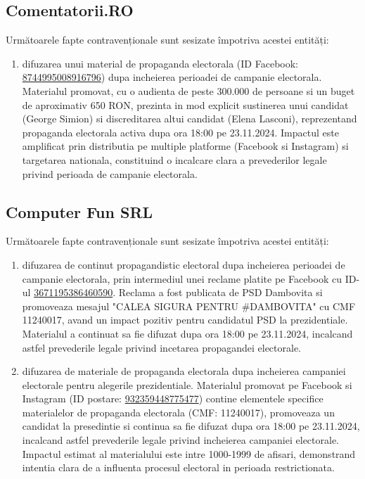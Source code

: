 \documentclass[a4paper,12pt]{article}
\begin{document}
\vspace{0.5cm}

\subsection{Comentatorii.RO}
Următoarele fapte contravenționale sunt sesizate împotriva acestei entități:

\begin{enumerate}[leftmargin=*, label=\arabic*.)]
    \item difuzarea unui material de propaganda electorala (ID Facebook: \href{https://www.facebook.com/ads/library/?id=8744995008916796}{8744995008916796}) dupa incheierea perioadei de campanie electorala. Materialul promovat, cu o audienta de peste 300.000 de persoane si un buget de aproximativ 650 RON, prezinta in mod explicit sustinerea unui candidat (George Simion) si discreditarea altui candidat (Elena Lasconi), reprezentand propaganda electorala activa dupa ora 18:00 pe 23.11.2024. Impactul este amplificat prin distributia pe multiple platforme (Facebook si Instagram) si targetarea nationala, constituind o incalcare clara a prevederilor legale privind perioada de campanie electorala.
\end{enumerate}

\vspace{0.5cm}

\subsection{Computer Fun SRL}
Următoarele fapte contravenționale sunt sesizate împotriva acestei entități:

\begin{enumerate}[leftmargin=*, label=\arabic*.)]
    \item difuzarea de continut propagandistic electoral dupa incheierea perioadei de campanie electorala, prin intermediul unei reclame platite pe Facebook cu ID-ul \href{https://www.facebook.com/ads/library/?id=3671195386460590}{3671195386460590}. Reclama a fost publicata de PSD Dambovita si promoveaza mesajul "CALEA SIGURA PENTRU \#DAMBOVITA" cu CMF 11240017, avand un impact pozitiv pentru candidatul PSD la prezidentiale. Materialul a continuat sa fie difuzat dupa ora 18:00 pe 23.11.2024, incalcand astfel prevederile legale privind incetarea propagandei electorale.
    \item difuzarea de materiale de propaganda electorala dupa incheierea campaniei electorale pentru alegerile prezidentiale. Materialul promovat pe Facebook si Instagram (ID postare: \href{https://www.facebook.com/ads/library/?id=932359448775477}{932359448775477}) contine elementele specifice materialelor de propaganda electorala (CMF: 11240017), promoveaza un candidat la presedintie si continua sa fie difuzat dupa ora 18:00 pe 23.11.2024, incalcand astfel prevederile legale privind incheierea campaniei electorale. Impactul estimat al materialului este intre 1000-1999 de afisari, demonstrand intentia clara de a influenta procesul electoral in perioada restrictionata.
\end{enumerate}
\end{document}
